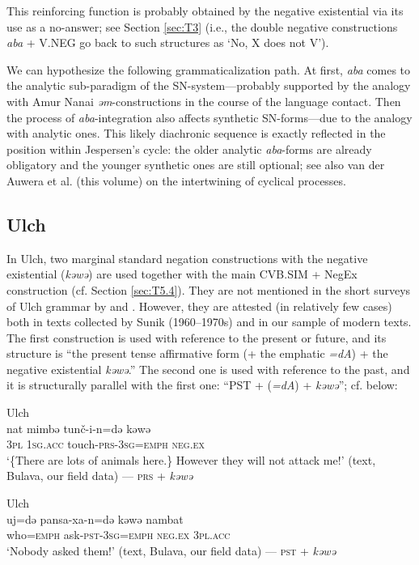 \documentclass[output=paper]{langscibook}
\begin{document}

This reinforcing function is probably obtained by the negative existential via its use as a no-answer; see Section \ref{sec:T3} (i.e., the double negative constructions \textit{aba} + V.NEG go back to such structures as ‘No, X does not V’).

We can hypothesize the following grammaticalization path. At first, \textit{aba} comes to the analytic sub-paradigm of the SN-system—probably supported by the analogy with Amur Nanai \textit{əm}-constructions in the course of the language contact. Then the process of \textit{aba}-integration also affects synthetic SN-forms—due to the analogy with analytic ones. This likely diachronic sequence is exactly reflected in the position within Jespersen’s cycle: the older analytic \textit{aba}-forms are already obligatory and the younger synthetic ones are still optional; see also van der Auwera et al. (this volume) on the intertwining of cyclical processes.

\subsection{Ulch}\label{sec:T6.2}

In Ulch, two marginal standard negation constructions with the negative existential (\textit{kəwə}) are used together with the main CVB.SIM + NegEx construction (cf. Section \ref{sec:T5.4}). They are not mentioned in the short surveys of Ulch grammar by \citet{petrova1936a} and \citet{sunik1985a}. However, they are attested (in relatively few cases) both in texts collected by Sunik (1960–1970s) and in our sample of modern texts. The first construction is used with reference to the present or future, and its structure is “the present tense affirmative form (+ the emphatic \textit{=dA}) + the negative existential \textit{kəwə}.” The second one is used with reference to the past, and it is structurally parallel with the first one: “PST + (\textit{=dA}) + \textit{kəwə}”; cf. below:

\ea Ulch \label{ex:T28}\\
	\gll nat	mimbə	tunč-i-n=də	kəwə\\
	\textsc{3pl}	\textsc{1sg.acc}	touch-\textsc{prs-3sg=emph}	\textsc{neg.ex}\\
	\glt `\{There are lots of animals here.\} However they will not attack me!' (text, Bulava, our field data) — \textsc{prs} + \textit{kəwə}
\z

\ea Ulch \label{ex:T29}\\
	\gll uj=də	pansa-xa-n=də	kəwə	nambat\\
	who=\textsc{emph}	ask-\textsc{pst-3sg=emph}	\textsc{neg.ex}	\textsc{3pl.acc}\\
	\glt `Nobody asked them!' (text, Bulava, our field data) — \textsc{pst} + \textit{kəwə}
\z
\end{document}
